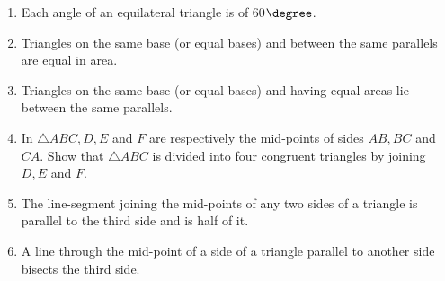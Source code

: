 \renewcommand{\theequation}{\theenumi}
\begin{enumerate}[label=\arabic*.,ref=\thesubsection.\theenumi]
%
\item  Each angle of an equilateral triangle is of 60$\degree$. 

%


\item Triangles on the same base (or equal bases) and between the same parallels are equal in area.

\item Triangles on the same base (or equal bases) and having equal areas lie between the same parallels.
\item In $\triangle ABC, D, E$ and $F$ are respectively the mid-points of sides $AB, BC$ and $CA $. Show that $\triangle ABC$ is divided into four congruent triangles by joining $D, E$ and $F$.
\item  The line-segment joining the mid-points of any two sides of a triangle is parallel to the third side and is half of it.
\label{prob:tri_mid_similar}
%
\item  A line through the mid-point of a side of a triangle parallel to another side 
bisects the third side.


\end{enumerate}
